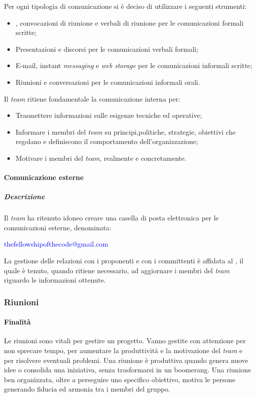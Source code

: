 Per ogni tipologia di comunicazione si è deciso di utilizzare i seguenti strumenti:
\begin{itemize}
\item
\textit{\PdP}, convocazioni di riunione e verbali di riunione per le comunicazioni formali scritte;
\item
Presentazioni e discorsi per le comunicazioni verbali formali; 
\item
E-mail, instant \textit{messaging} e \textit{web storage} per le comunicazioni informali scritte;
\item
Riunioni e conversazioni per le comunicazioni informali orali. 
\end{itemize}

Il \textit{team} ritiene fondamentale la comunicazione interna per:
\begin{itemize}
\item
Trasmettere informazioni sulle esigenze tecniche ed operative;
\item
Informare i membri del \textit{team} su principi,politiche, strategie, obiettivi che regolano e definiscono il comportamento dell'organizzazione;
\item
Motivare i membri del \textit{team}, realmente e concretamente.
\end{itemize}


\paragraph{Comunicazione esterne}
\subparagraph{Descrizione}
Il \textit{team} ha ritenuto idoneo creare una casella di posta elettronica per le comunicazioni esterne, denominata:

\begin{center} \textcolor{blue}{thefellowshipofthecode@gmail.com} \end{center}

La gestione delle relazioni con i proponenti e con i committenti è affidata al \textit{\RdP}, il quale è tenuto, quando ritiene necessario, ad aggiornare i membri del \textit{team} riguardo le informazioni ottenute. 


\subsubsection{Riunioni}

\paragraph{Finalità}
Le riunioni sono vitali per gestire un progetto. Vanno gestite con attenzione per non sprecare tempo, per aumentare la produttività e la motivazione del \textit{team} e per risolvere eventuali problemi. Una riunione è produttiva quando genera nuove idee o consolida una iniziativa, senza trasformarsi in un boomerang.
Una riunione ben organizzata, oltre a perseguire uno specifico obiettivo, motiva le persone generando fiducia ed armonia tra i membri del gruppo.

